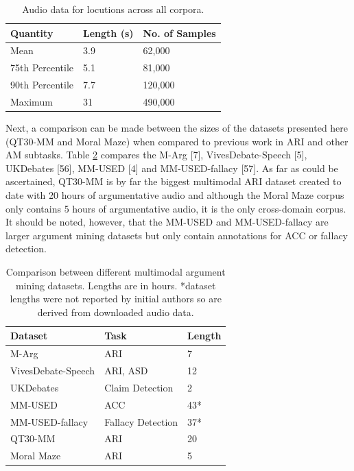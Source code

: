 \documentclass[twocolumn]{article}
\begin{document}
\begin{table}[h]
\centering
\caption{Audio data for locutions across all corpora.\label{tbl:audio-complete}}
\begin{tabular}{|l|ll|}
\hline
Quantity        & Length (s) & No. of Samples \\ \hline
Mean            & 3.9        & 62,000         \\
75th Percentile & 5.1        & 81,000         \\
90th Percentile & 7.7        & 120,000        \\
Maximum         & 31         & 490,000        \\ \hline
\end{tabular}
\end{table}

Next, a comparison can be made between the sizes of the datasets
presented here (QT30-MM and Moral Maze) when compared to previous work
in ARI and other AM subtasks. Table \ref{tbl:mm-comparison} compares the
M-Arg {[}7{]}, VivesDebate-Speech {[}5{]}, UKDebates {[}56{]}, MM-USED
{[}4{]} and MM-USED-fallacy {[}57{]}. As far as could be ascertained,
QT30-MM is by far the biggest multimodal ARI dataset created
to date with 20 hours of argumentative audio and although the Moral Maze
corpus only contains 5 hours of argumentative audio, it is the only
cross-domain corpus. It should be noted, however, that the MM-USED and MM-USED-fallacy are larger argument mining datasets but only contain annotations for ACC or fallacy detection.

\begin{table}[h]
\centering
\caption{Comparison between different multimodal argument mining datasets. Lengths are in hours. *dataset lengths were not reported by initial authors so are derived from downloaded audio data. \label{tbl:mm-comparison}}
\begin{tabular}{|l|l|l|}
\hline
Dataset            & Task              & Length \\ \hline
M-Arg              & ARI               & 7              \\
VivesDebate-Speech & ARI, ASD          & 12             \\
UKDebates          & Claim Detection   & 2              \\
MM-USED            & ACC          & 43*           \\
MM-USED-fallacy    & Fallacy Detection & 37*           \\ \hline
QT30-MM            & ARI               & 20             \\
Moral Maze         & ARI               & 5              \\ \hline
\end{tabular}
\end{table}
\end{document}
